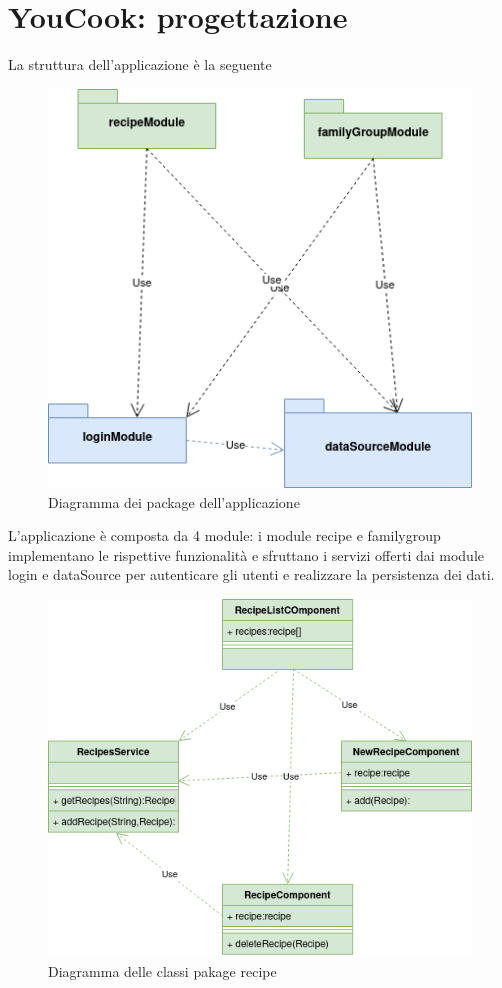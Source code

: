 \section{YouCook: progettazione}
La struttura dell'applicazione è la seguente
\begin{figure}[H]
    \centering
 \includegraphics[scale=0.7]{resources/diagramma_package-diagramma_package.drawio.png}
   \caption{Diagramma dei package dell'applicazione}
\end{figure}
L'applicazione è composta da 4 module: i module recipe e familygroup implementano le rispettive funzionalità e sfruttano i servizi offerti dai module login e dataSource per autenticare gli utenti e realizzare la persistenza dei dati. 
\begin{figure}[H]
    \centering
 \includegraphics[scale=0.7]{resources/diagramma_package-recipe.drawio.png}
   \caption{Diagramma delle classi pakage recipe}
\end{figure}
 
